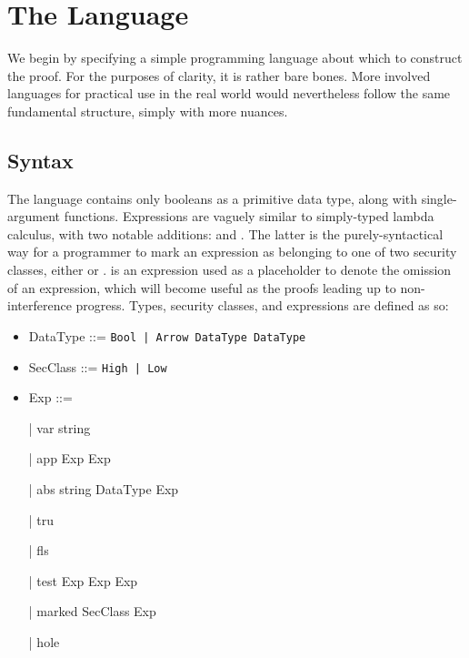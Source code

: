 \documentclass[12pt]{report}
\begin{document}
\section{The Language}



We begin by specifying a simple programming language about which to
construct the proof. For the purposes of clarity, it is rather bare
bones. More involved languages for practical use in the real world
would nevertheless follow the same fundamental structure, simply with
more nuances.

\subsection{Syntax}



The language contains only booleans as a primitive data type, along
with single-argument functions. Expressions are vaguely similar to
simply-typed lambda calculus, with two notable additions:
 and . The latter is the
purely-syntactical way for a programmer to mark an expression as
belonging to one of two security classes, either  or
.  is an expression used as
a placeholder to denote the omission of an expression, which will
become useful as the proofs leading up to non-interference progress.
Types, security classes, and expressions are defined as so: 



\begin{itemize}
\item  DataType ::= \texttt{Bool | Arrow DataType DataType }

\item  SecClass ::= \texttt{High | Low }

\item  Exp ::=

    | var string

    | app Exp Exp
    
    | abs string DataType Exp
    
    | tru
    
    | fls
    
    | test Exp Exp Exp
    
    | marked SecClass Exp
    
    | hole

\end{itemize}
\end{document}

